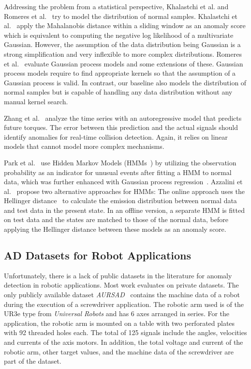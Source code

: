 \documentclass[journal]{IEEEtran}
\begin{document}
Addressing the problem from a statistical perspective,  Khalastchi et al. \cite{khalastchi2015online} and Romeres et al.~\cite{romeres2019anomaly} try to model the distribution of normal samples.
Khalastchi et al.~\cite{khalastchi2015online} apply the Mahalanobis distance within a sliding window as an anomaly score which is equivalent to computing the negative log likelihood of a multivariate Gaussian.
However, the assumption of the data distribution being Gaussian is a strong simplification and very inflexible to more complex distributions.
Romeres et al.~\cite{romeres2019anomaly} evaluate Gaussian process models and some extensions of these.
Gaussian process models require to find appropriate kernels so that the assumption of a Gaussian process is valid.
In contrast, our baseline also models the distribution of normal samples but is capable of handling any data distribution without any manual kernel search.

Zhang et al.~\cite{zhang2021robot} analyze the time series with an autoregressive model that predicts future torques.
The error between this prediction and the actual signals should identify anomalies for real-time collision detection.
Again, it relies on linear models that cannot model more complex mechanisms.

Park et al.~\cite{park2016multimodal} use Hidden Markov Models (HMMs~\cite{hmm}) by utilizing the observation probability as an indicator for unusual events after fitting a HMM to normal data, which was further enhanced with Gaussian process regression~\cite{park2019multimodal}.
Azzalini et al.~\cite{hmm_ad} propose two alternative approaches for HMMs: The online approach uses the Hellinger distance~\cite{hellinger1909neue} to calculate the emission distribution between normal data and test data in the present state.
In an offline version, a separate HMM is fitted on test data and the states are matched to those of the normal data, {before applying the Hellinger distance between these models as an anomaly score}.

\subsection{AD Datasets for Robot Applications}
\label{ad_datasets}
Unfortunately, there is a lack of public datasets in the literature for anomaly detection in robotic applications.
Most work evaluates on private datasets.
The only publicly available dataset \textit{AURSAD}~\cite{aursad} contains the machine data of a robot during the execution of a screwdriver application.
The robotic arm used is of the UR3e type from \textit{Universal Robots} and has 6 axes arranged in series.
For the application, the robotic arm is mounted on a table with two perforated plates with 92 threaded holes each.
The total of 125 signals include the angles, velocities and currents of the axis motors. In addition, the total voltage and current of the robotic arm, other target values, and the machine data of the screwdriver are part of the dataset.
\end{document}
